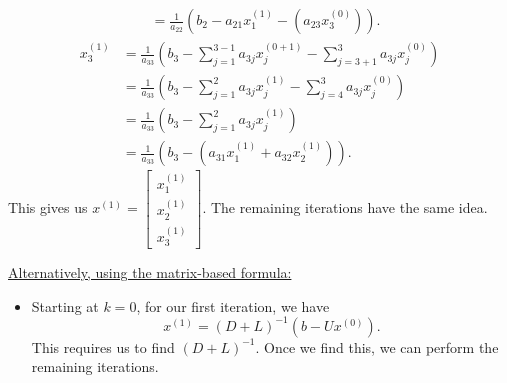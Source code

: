 \documentclass[letterpaper]{article}
\newcommand{\0}{\mathbf{0}}
\begin{document}
\begin{mdframed}
\begin{itemize}
\begin{equation*}
\begin{aligned}
                    &= \frac{1}{a_{22}} \left(b_{2} - a_{21} x_{1}^{(1)} - (a_{23}x_{3}^{(0)})\right).
            \end{aligned}
        \end{equation*}
        \begin{equation*}
            \begin{aligned}
                x_{3}^{(1)} &= \frac{1}{a_{33}} \left(b_{3} - \sum_{j = 1}^{3 - 1} a_{3j} x_{j}^{(0 + 1)} - \sum_{j = 3 + 1}^{3} a_{3j}x_{j}^{(0)}\right) \\ 
                    &= \frac{1}{a_{33}} \left(b_{3} - \sum_{j = 1}^{2} a_{3j} x_{j}^{(1)} - \sum_{j = 4}^{3} a_{3j}x_{j}^{(0)}\right) \\ 
                    &= \frac{1}{a_{33}} \left(b_{3} - \sum_{j = 1}^{2} a_{3j} x_{j}^{(1)}\right) \\
                    &= \frac{1}{a_{33}} \left(b_{3} - (a_{31} x_{1}^{(1)} + a_{32} x_{2}^{(1)})\right).
            \end{aligned}
        \end{equation*}
        This gives us $x^{(1)} = \begin{bmatrix}
            x_{1}^{(1)} \\ 
            x_{2}^{(1)} \\ 
            x_{3}^{(1)} 
        \end{bmatrix}$. The remaining iterations have the same idea.
    \end{itemize}
    \underline{Alternatively, using the matrix-based formula:}
    \begin{itemize}
        \item Starting at $k = 0$, for our first iteration, we have 
        \[x^{(1)} = (D + L)^{-1}(b - Ux^{(0)}).\]
        This requires us to find $(D + L)^{-1}$. Once we find this, we can perform the remaining iterations. 
    \end{itemize}
\end{mdframed}
\end{document}
